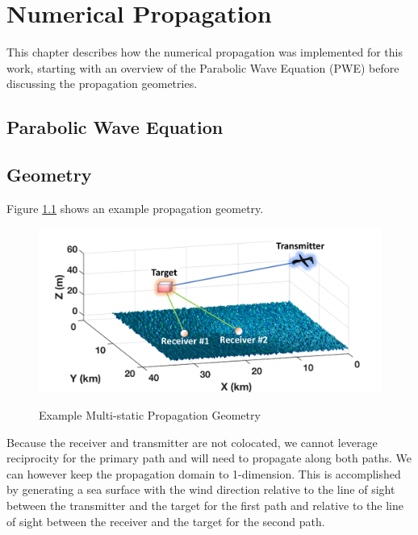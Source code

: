 \chapter{Numerical Propagation}
\label{numerical_propagation}
This chapter describes how the numerical propagation was implemented for this work, starting with an overview of the Parabolic Wave Equation (PWE) before discussing the propagation geometries.

\section{Parabolic Wave Equation}

\section{Geometry}
Figure \ref{np_fig:1} shows an example propagation geometry.
\begin{figure}[H]
  \begin{center} 
\includegraphics[width=5in]{../media/multistatic/ms_rf_concept2.png}
  \end{center}
  \renewcommand{\baselinestretch}{1} \small\normalsize
  \begin{quote}
    \caption[Example Multi-static Propagation Geometry]{Example Multi-static Propagation Geometry\label{np_fig:1}}
  \end{quote}
\end{figure}
\renewcommand{\baselinestretch}{2} \small\normalsize

Because the receiver and transmitter are not colocated, we cannot leverage reciprocity for the primary path and will need to propagate along both paths. We can however keep the propagation domain to 1-dimension. This is accomplished by generating a sea surface with the wind direction relative to the line of sight between the transmitter and the target for the first path and relative to the line of sight between the receiver and the target for the second path.